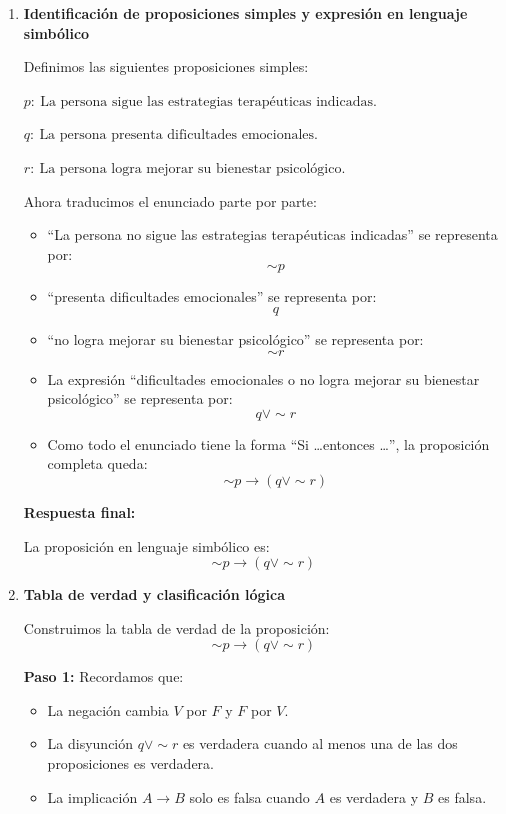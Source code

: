 \documentclass[12pt]{article}
\begin{document}
	\begin{enumerate}[label=\alph*)]
		
		\item \textbf{Identificación de proposiciones simples y expresión en lenguaje simbólico}
		
		Definimos las siguientes proposiciones simples:
		
		$p:\ \text{La persona sigue las estrategias terapéuticas indicadas.}$


		$q:\ \text{La persona presenta dificultades emocionales.}$
		
		$r:\ \text{La persona logra mejorar su bienestar psicológico.}$
		
		
		Ahora traducimos el enunciado parte por parte:
		
		\begin{itemize}
			\item ``La persona no sigue las estrategias terapéuticas indicadas'' se representa por:
			\[
			\sim p
			\]
			
			\item ``presenta dificultades emocionales'' se representa por:
			\[
			q
			\]
			
			\item ``no logra mejorar su bienestar psicológico'' se representa por:
			\[
			\sim r
			\]
			
			\item La expresión ``dificultades emocionales o no logra mejorar su bienestar psicológico'' se representa por:
			\[
			q \lor \sim r
			\]
			
			\item Como todo el enunciado tiene la forma ``Si \dots entonces \dots'', la proposición completa queda:
			\[
			\sim p \to (q \lor \sim r)
			\]
		\end{itemize}
		
		\textbf{Respuesta final:}
		
		La proposición en lenguaje simbólico es:
		\[
		\boxed{\sim p \to (q \lor \sim r)}
		\]
		
		\vspace{0.4cm}
		
		\item \textbf{Tabla de verdad y clasificación lógica}
		
		Construimos la tabla de verdad de la proposición:
		\[
		\sim p \to (q \lor \sim r)
		\]
		
		\textbf{Paso 1:} Recordamos que:
		\begin{itemize}
			\item La negación cambia \(V\) por \(F\) y \(F\) por \(V\).
			\item La disyunción \(q \lor \sim r\) es verdadera cuando al menos una de las dos proposiciones es verdadera.
			\item La implicación \(A \to B\) solo es falsa cuando \(A\) es verdadera y \(B\) es falsa.
		\end{itemize}
		

\end{enumerate}
\end{document}
